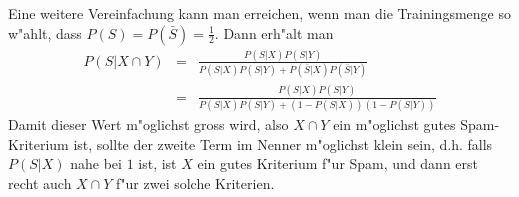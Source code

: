 Eine weitere Vereinfachung kann man erreichen, wenn man die Trainingsmenge so
w"ahlt, dass $P(S)=P(\bar S)=\frac12$. Dann erh"alt man
\begin{eqnarray}
P(S|X\cap Y)&=&\frac{P(S|X)P(S|Y)}{P(S|X)P(S|Y)+P(\bar S|X)P(\bar S|Y)}\nonumber\\
&=&\frac{P(S|X)P(S|Y)}{P(S|X)P(S|Y)+(1-P(S|X))(1-P(S|Y))}
\end{eqnarray}
Damit dieser Wert m"oglichst gross wird, also $X\cap Y$ ein m"oglichst
gutes Spam-Kriterium ist, sollte der zweite Term im Nenner m"oglichst klein
sein, d.h. falls $P(S|X)$ nahe bei $1$ ist, ist $X$ ein gutes Kriterium f"ur
Spam, und dann erst recht auch $X\cap Y$ f"ur zwei solche Kriterien.
